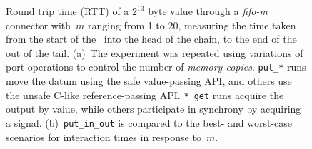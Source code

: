 \begin{figure}
{\begin{subfigure}[b]{0.63\textwidth}
			\caption{}
			\label{fig:fifo_m_1}
		\end{subfigure}%
	}
	\caption[RTT for fifo-M connector with $2^{13}$ byte values.]{Round trip time (RTT) of a $2^{13}$ byte value through a \textit{fifo-m} connector with~$m$ ranging from 1 to 20, measuring the time taken from the start of the~ into the head of the chain, to the end of the  out of the tail. (a)~The experiment was repeated using variations of port-operations to control the number of \textit{memory copies}. \texttt{put\_*} runs move the datum using the safe value-passing API, and others use the unsafe C-like reference-passing API. \texttt{*\_get} runs acquire the output by value, while others participate in synchrony by acquiring a signal. (b)~\texttt{put\_in\_out} is compared to the best- and worst-case scenarios for interaction times in response to~$m$.}
	\label{fig:fifo_m}
\end{figure}
